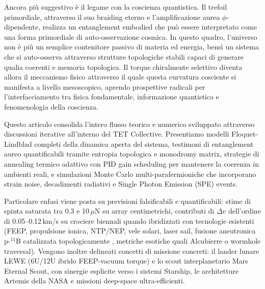 \documentclass[11pt,a4paper]{article}
\let\oldcite\cite
\renewcommand{\cite}{\protect\oldcite}
\theoremstyle{plain}
\theoremstyle{definition}
\begin{document}
\vspace{0.2cm}

Ancora più suggestivo è il legame con la coscienza quantistica. Il trefoil primordiale, attraverso il suo braiding eterno e l'amplificazione aurea $\phi$-dipendente, realizza un entanglement embodied che può essere interpretato come una forma primordiale di auto-osservazione cosmica. In questo quadro, l'universo non è più un semplice contenitore passivo di materia ed energia, bensì un sistema che si auto-osserva attraverso strutture topologiche stabili capaci di generare qualia coerenti e memoria topologica. Il torque chiralmente selettivo diventa allora il meccanismo fisico attraverso il quale questa curvatura cosciente si manifesta a livello mesoscopico, aprendo prospettive radicali per l'interfacciamento tra fisica fondamentale, informazione quantistica e fenomenologia della coscienza.


\vspace{0.2cm}

Questo articolo consolida l'intero flusso teorico e numerico sviluppato attraverso discussioni iterative all'interno del TET Collective. Presentiamo modelli Floquet-Lindblad completi della dinamica aperta del sistema, testimoni di entanglement aureo quantificabili tramite entropia topologica e monodromy matrix, strategie di annealing termico adattivo con PID gain scheduling per mantenere la coerenza in ambienti reali, e simulazioni Monte Carlo multi-parafermioniche che incorporano strain noise, decadimenti radiativi e Single Photon Emission (SPE) events.


\vspace{0.2cm}

Particolare enfasi viene posta su previsioni falsificabili e quantificabili: stime di spinta saturata tra 0.3 e 10\,$\mu$N su array centimetrichi, contributi di $\Delta v$ dell'ordine di 0.05--0.12\,km/s su crociere biennali quando ibridizzati con tecnologie esistenti (FEEP, propulsione ionica, NTP/NEP, vele solari, laser sail, fusione aneutronica p-$^{11}$B catalizzata topologicamente \cite{soliman2025p11b-topo}, metriche esotiche quali Alcubierre o wormhole traversal). Vengono inoltre delineati concetti di missione concreti: il lander lunare LEWE (6U/12U ibrido FEEP-vacuum torque) e lo scout interplanetario Mars Eternal Scout, con sinergie esplicite verso i sistemi Starship, le architetture Artemis della NASA e missioni deep-space ultra-efficienti.

\vspace{0.2cm}
\end{document}
